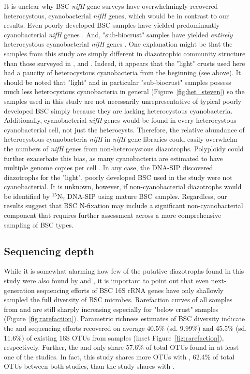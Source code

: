 It is unclear why BSC \textit{nifH} gene surveys have overwhelmingly recovered
heterocystous, cyanobacterial \textit{nifH} genes, which would be in contrast to
our results. Even poorly developed BSC samples have yielded predominantly
cyanobacterial \textit{nifH} genes \citep{14766579}. And, "sub-biocrust"
samples have yielded \textit{entirely} heterocystous cyanobacterial
\textit{nifH} genes \citep{Yeager_2012}. One explanation might be that the
samples from this study are simply different in diazotrophic community
structure than those surveyed in \citet{Yeager}, \citet{14766579} and
\citet{Yeager_2012}.  Indeed, it appears that the "light" crusts used here had
a paucity of heterocystous cyanobacteria from the beginning (see above). It
should be noted that "light" and in particular "sub-biocrust" samples possess
much less heterocystous cyanobacteria in general (Figure~\ref{fig:het_steven})
so the samples used in this study are not necessarily unrepresentative of
typical poorly developed BSC simply because they are lacking heterocystous
cyanobacteria. Additionally, cyanobacterial \textit{nifH} genes would be found
in every heterocystous cyanobacterial cell, not just the heterocysts.
Therefore, the relative abundance of heterocystous cyanobacteria \textit{nifH}
in \textit{nifH} gene libraries could easily overwhelm the numbers of
\textit{nifH} genes from non-heterocystous diazotrophs. Polyploidy could
further exacerbate this bias, as many cyanobacteria are estimated to have
multiple genome copies per cell \citep{Griese_2011}. In any case, the DNA-SIP
discovered diazotrophs for the "light", poorly developed BSC used in the study
were not cyanobacterial. It is unknown, however, if non-cyanobacterial diazotrophs
would be identified by $^{15}$N$_{2}$ DNA-SIP using mature BSC samples.
Regardless, our results suggest that BSC N-fixation may include a significant
non-cyanobacterial component that requires further assessment across a more
comprehensive sampling of BSC types.

\subsection{Sequencing depth}
While it is somewhat alarming how few of the putative diazotrophs found in this
study were also found by \citet{Garcia_Pichel_2013} and \citet{Steven_2013}, it
is important to point out that even next-generation sequencing efforts of BSC
16S rRNA genes have only shallowly sampled the full diversity of BSC microbes.
Rarefaction curves of all samples from \citet{Steven_2013} and
\citet{Garcia_Pichel_2013} are still sharply increasing especially for "below
crust" samples (Figure~\ref{fig:rarefaction}). Parametric richness estimates of
BSC diversity indicate the \citet{Steven_2013} and \citet{Garcia_Pichel_2013}
sequencing efforts recovered on average 40.5\% (sd. 9.99\%) and 45.5\% (sd.
11.6\%) of existing 16S OTUs from samples (inset Figure~\ref{fig:rarefaction}),
respectively. Further, the \citet{Steven_2013} and \citet{Garcia_Pichel_2013}
only share 57.6\% of total OTUs found in at least one of the studies. In fact,
this study shares more OTUs with \citet{Steven_2013}, 62.4\% of total OTUs
between both studies, than the \citet{Steven_2013} study shares with
\citet{Garcia_Pichel_2013}. 

